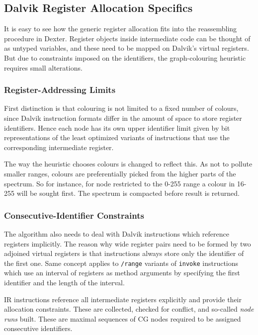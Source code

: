 \documentclass[12pt,twoside,notitlepage]{report}
\begin{document}
\subsection{Dalvik Register Allocation Specifics}

It is easy to see how the generic register allocation fits into the reassembling procedure in Dexter. Register objects inside intermediate code can be thought of as untyped variables, and these need to be mapped on Dalvik's virtual registers. But due to constraints imposed on the identifiers, the graph-colouring heuristic requires small alterations.

\subsubsection{Register-Addressing Limits}

First distinction is that colouring is not limited to a fixed number of colours, since Dalvik instruction formats differ in the amount of space to store register identifiers. Hence each node has its own upper identifier limit given by bit representations of the least optimized variants of instructions that use the corresponding intermediate register.

The way the heuristic chooses colours is changed to reflect this. As not to pollute smaller ranges, colours are preferentially picked from the higher parts of the spectrum. So for instance, for node restricted to the \mbox{0-255} range a colour in \mbox{16-255} will be sought first. The spectrum is compacted before result is returned.

\subsubsection{Consecutive-Identifier Constraints}

The algorithm also needs to deal with Dalvik instructions which reference registers implicitly. The reason why wide register pairs need to be formed by two adjoined virtual registers is that instructions always store only the identifier of the first one. Same concept applies to \verb$/range$ variants of \verb$invoke$ instructions which use an interval of registers as method arguments by specifying the first identifier and the length of the interval.

IR instructions reference all intermediate registers explicitly and provide their allocation constraints. These are collected, checked for conflict, and so-called \emph{node runs} built. These are maximal sequences of CG nodes required to be assigned consecutive identifiers. 
\end{document}
